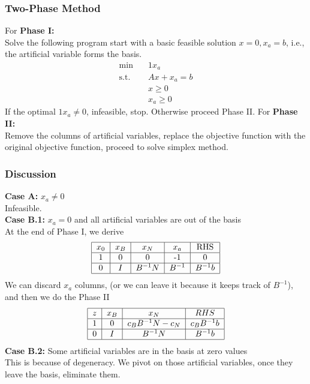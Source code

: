 				\subsubsection{Two-Phase Method}
					For \textbf{Phase I:}\\
						Solve the following program start with a basic feasible solution $x=0, x_a=b$, i.e., the artificial variable forms the basis.
						\begin{align}
							\min \quad & 1x_a \\
							\text{s.t.} \quad & Ax + x_a = b \\
											  & x \ge 0 \\
											  & x_a \ge 0 
						\end{align}
						If the optimal $1x_a \ne 0$, infeasible, stop. Otherwise proceed Phase II.
					For \textbf{Phase II:}\\
						Remove the columns of artificial variables, replace the objective function with the original objective function, proceed to solve simplex method.
				\subsubsection{Discussion}
					\textbf{Case A:} $x_a \ne 0$\\
						Infeasible.\\
					\textbf{Case B.1:} $x_a = 0$ and all artificial variables are out of the basis\\
					At the end of Phase I, we derive
					\begin{align}
						\begin{tabular} {|c|c|c|c|c|}
							\hline
							$x_0$ & $x_B$ & $x_N$ & $x_a$ & RHS \\
							\hline
							1 & 0 & 0 & -1 & 0\\
							\hline
							0 & $I$ & $B^{-1}N$ & $B^{-1}$ & $B^{-1}b$ \\
							\hline
						\end{tabular} 
					\end{align}
					We can discard $x_a$ columns, (or we can leave it because it keeps track of $B^{-1}$), and then we do the Phase II
					\begin{align}
						\begin{tabular} {|c|c|c|c|}
							\hline
							$z$ & $x_B$ & $x_N$ & $RHS$ \\
							\hline
							1 & 0 & $c_BB^{-1}N - c_N$ & $c_BB^{-1}b$ \\
							\hline
							0 & $I$ & $B^{-1}N$ & $B^{-1}b$ \\
							\hline
						\end{tabular} 
					\end{align}
					\textbf{Case B.2:} Some artificial variables are in the basis at zero values\\
					This is because of degeneracy. We pivot on those artificial variables, once they leave the basis, eliminate them.
